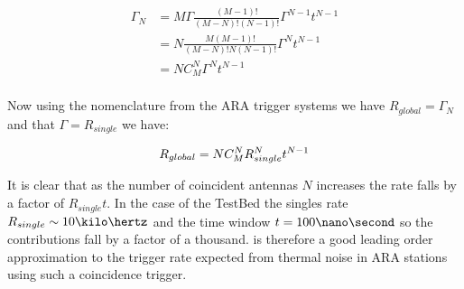\begin{equation}
  \begin{split}
    \Gamma_{N} &= M \Gamma \frac{(M-1)!}{(M-N)!(N-1)!} \Gamma^{N-1} t^{N-1} \\
    &= N \frac{M(M-1)!}{(M-N)!N(N-1)!} \Gamma^{N} t^{N-1}\\
    &= N C^{N}_{M}     \Gamma^{N} t^{N-1}\\
  \end{split}
\end{equation}

Now using the nomenclature from the ARA trigger systems we have $R_{global} = \Gamma_{N}$ and that $\Gamma = R_{single}$ we have:

\begin{equation}
  R_{global} = NC^{N}_{M}R^{N}_{single}t^{N-1}\\
  \label{eq:ARA-Trigger-Rate}
\end{equation}


It is clear that as the number of coincident antennas $N$ increases the rate falls by a factor of $R_{single}t$. In the case of the TestBed the singles rate $R_{single} \sim 10 \kilo\hertz$ and the time window $t = 100 \nano\second$ so the contributions fall by a factor of a thousand.  is therefore a good leading order approximation to the trigger rate expected from thermal noise in ARA stations using such a coincidence trigger.
